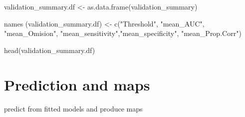 \documentclass[
]{book}
\newenvironment{Shaded}{\begin{snugshade}}{\end{snugshade}}
\newcommand{\FunctionTok}[1]{\textcolor[rgb]{0.00,0.00,0.00}{#1}}
\newcommand{\NormalTok}[1]{#1}
\newcommand{\OtherTok}[1]{\textcolor[rgb]{0.56,0.35,0.01}{#1}}
\newcommand{\StringTok}[1]{\textcolor[rgb]{0.31,0.60,0.02}{#1}}
\begin{document}
\begin{Shaded}
\begin{Highlighting}[]
\NormalTok{  validation\_summary.df }\OtherTok{\textless{}{-}} \FunctionTok{as.data.frame}\NormalTok{(validation\_summary)}

  \FunctionTok{names}\NormalTok{ (validation\_summary.df) }\OtherTok{\textless{}{-}} \FunctionTok{c}\NormalTok{(}\StringTok{"Threshold"}\NormalTok{, }\StringTok{"mean\_AUC"}\NormalTok{, }\StringTok{"mean\_Omision"}\NormalTok{, }\StringTok{"mean\_sensitivity"}\NormalTok{,}\StringTok{"mean\_specificity"}\NormalTok{, }\StringTok{"mean\_Prop.Corr"}\NormalTok{)}

  \FunctionTok{head}\NormalTok{(validation\_summary.df)}
\end{Highlighting}
\end{Shaded}

\hypertarget{prediction-and-maps}{%
\chapter{Prediction and maps}\label{prediction-and-maps}}

predict from fitted models and produce maps

  
\end{document}
